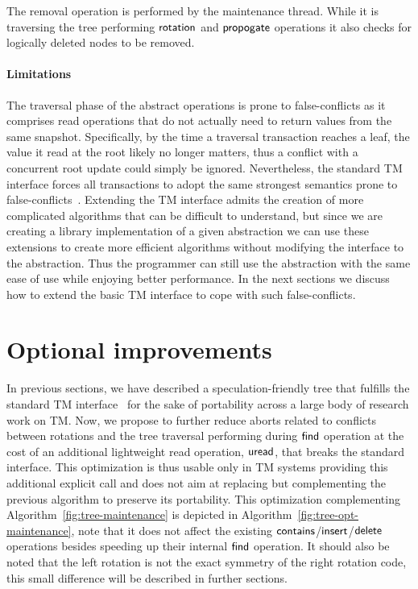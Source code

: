 The removal operation is performed by the maintenance thread. While it is traversing the tree performing $\act{rotation}$ and $\act{propogate}$ operations it
also checks for logically deleted nodes to be removed.

\paragraph{Limitations}
The traversal phase of the abstract operations is prone to false-conflicts as it comprises read operations that 
do not actually need to return values from the same snapshot. Specifically, by the time a traversal transaction 
reaches a leaf, the value it read at the root likely no longer matters, thus a conflict 
with a concurrent root update could simply be ignored. Nevertheless, the standard TM interface
forces all transactions to adopt the same strongest semantics prone to false-conflicts~\cite{GG11}.
Extending the TM interface admits the creation of more complicated algorithms that can be difficult to understand, but
since we are creating a library implementation of a given abstraction
we can use these extensions to create more efficient algorithms without modifying the interface to the abstraction.
Thus the programmer can still use the abstraction with the same ease of use while enjoying better performance.
In the next sections we discuss how to extend the basic TM interface to cope with such false-conflicts.

\section{Optional improvements}\label{sec:improvements}

In previous sections, we have described a speculation-friendly tree that fulfills the standard TM interface~\cite{abi} 
for the sake of portability across a large body of research work on TM.
Now, we propose to further reduce aborts related to conflicts between rotations and the tree traversal performing during $\act{find}$ operation at the cost of an additional 
lightweight read operation, 
$\act{uread}$, that breaks the standard interface. This optimization is thus usable only in TM systems providing this additional 
explicit call
and does not aim at replacing but complementing the previous algorithm 
to preserve its portability. This optimization complementing Algorithm~\ref{fig:tree-maintenance} is depicted in Algorithm~\ref{fig:tree-opt-maintenance}, note that it does not
affect the existing $\act{contains}$/$\act{insert}$/$\act{delete}$ operations besides speeding up their internal $\act{find}$ 
operation.
It should also be noted that the left rotation is not the exact symmetry of the right rotation code,
this small difference will be described in further sections. 



